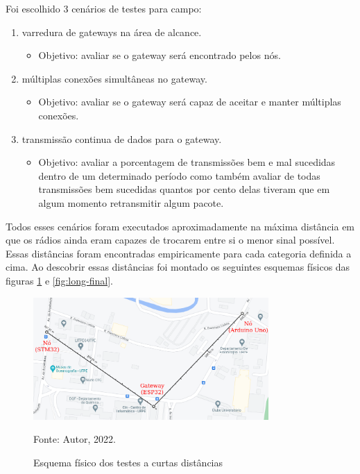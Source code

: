 Foi escolhido 3 cenários de testes para campo:
\begin{enumerate}
    \item varredura de gateways na área de alcance.
        \begin{itemize}
            \item Objetivo: avaliar se o gateway será encontrado pelos nós.
        \end{itemize}
	\item múltiplas conexões simultâneas no gateway.
         \begin{itemize}
            \item Objetivo: avaliar se o gateway será capaz de aceitar e manter múltiplas conexões.
        \end{itemize}
	\item transmissão continua de dados para o gateway.
        \begin{itemize}
            \item Objetivo: avaliar a porcentagem de transmissões bem e mal sucedidas dentro
            de um determinado período como também avaliar de todas transmissões bem sucedidas
            quantos por cento delas tiveram que em algum momento retransmitir algum pacote.
        \end{itemize}
\end{enumerate}

Todos esses cenários foram executados aproximadamente na máxima distância em que
os rádios ainda eram capazes de trocarem entre si o menor sinal possível. Essas distâncias
foram encontradas empiricamente para cada categoria definida a cima. Ao descobrir
essas distâncias foi montado os seguintes esquemas físicos das figuras \ref{fig:short-final}
e \ref{fig:long-final}.

\begin{figure}[H]
    \centering
	\caption{Esquema físico dos testes a curtas distâncias}
    \includegraphics[width=0.8\textwidth,keepaspectratio]{img/short-final.png}
    \label{fig:short-final}
    
    Fonte: Autor, 2022.
\end{figure}

